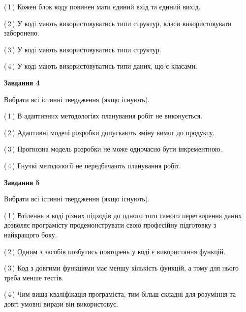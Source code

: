 \documentclass[10pt, ukrainian]{article}
\begin{document}
{\begin {large}
(\,1\,) Кожен блок коду повинен мати єдиний вхід та єдиний вихід.%



(\,2\,) У коді мають використовуватись типи структур, класи використовувати заборонено. %



(\,3\,) У коді мають використовуватись типи структур. %



(\,4\,) У коді мають використовуватись типи даних, що є класами. %


{\begin {center}\textbf{Завдання 4}\end {center}}\par
Вибрати всі істинні твердження (якщо існують).\par
\vspace{2mm}



(\,1\,) В адаптивних методологіях планування робіт не виконується. %



(\,2\,) Адаптивні моделі розробки допускають зміну вимог до продукту. %



(\,3\,) Прогнозна модель розробки не може одночасно бути інкрементною. %



(\,4\,) Гнучкі методології не передбачають планування робіт. %


{\begin {center}\textbf{Завдання 5}\end {center}}\par
Вибрати всі істинні твердження (якщо існують).\par
\vspace{2mm}



(\,1\,) Втілення в коді різних підходів до одного того самого перетворення даних дозволяє програмісту продемонструвати свою професійну підготовку з найкращого боку. %



(\,2\,) Одним з засобів позбутись повторень у коді є використання функцій. %



(\,3\,) Код з довгими функціями має меншу кількість функцій, а тому для нього треба менше тестів. %



(\,4\,) Чим вища кваліфікація програміста, тим більш складні для розуміння та довгі умовні вирази він використовує. %


\end{large}}
\end{document}
